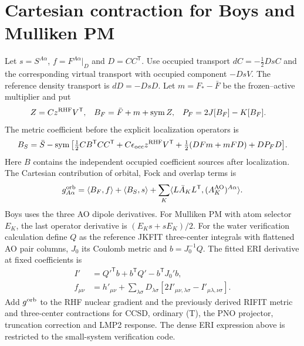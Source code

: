 \documentclass[11pt]{article}
\newcommand{\T}{^{\mathsf T}}
\newcommand{\sym}{\operatorname{sym}}
\newcommand{\ip}[2]{\langle #1,#2\rangle}
\begin{document}
\section{Cartesian contraction for Boys and Mulliken PM}
Let $s=S^{A\alpha}$, $f=F^{A\alpha}|_{D}$ and $D=CC\T$. Use occupied
transport $dC=-\tfrac12DsC$ and the corresponding virtual transport with
occupied component $-DsV$. The reference density transport is $dD=-DsD$.
Let $m=F_*-\bar F$ be the frozen--active multiplier and put
\begin{align}
 Z&=C z^{\rm RHF}V\T,& B_F&=\bar F+m+\sym Z,&
 P_F&=2J[B_F]-K[B_F].
\end{align}
The metric coefficient before the explicit localization operators is
\begin{align}
 B_S=\bar S-\sym\big[
 \tfrac12 C B\T CC\T + C\epsilon_{\rm occ}z^{\rm RHF}V\T
 +\tfrac12(DFm+mFD)+DP_F D\big].
\end{align}
Here $B$ contains the independent occupied coefficient sources after
localization. The Cartesian contribution of orbital, Fock and overlap terms is
\begin{equation}
 g_{A\alpha}^{\rm orb}=\ip{B_F}{f}+\ip{B_S}{s}
 +\sum_K\ip{L\bar A_K L\T}{(A_K^{\rm AO})^{A\alpha}}.
\end{equation}
Boys uses the three AO dipole derivatives. For Mulliken PM with atom selector
$E_K$, the last operator derivative is $(E_Ks+sE_K)/2$.
For the water verification calculation define $Q$ as the reference JKFIT
three-center integrals with flattened AO pair columns, $J_0$ its Coulomb
metric and $b=J_0^{-1}Q$. The fitted ERI derivative at fixed coefficients is
\begin{align}
 I'&={Q'}\T b+b\T Q'-b\T J_0' b,\\
 f_{\mu\nu}&=h'_{\mu\nu}+\sum_{\lambda\sigma}D_{\lambda\sigma}
 [2 I'_{\mu\nu,\lambda\sigma}-I'_{\mu\lambda,\nu\sigma}].
\end{align}
Add $g^{\rm orb}$ to the RHF nuclear gradient and the previously derived
RIFIT metric and three-center contractions for CCSD, ordinary (T), the PNO
projector, truncation correction and LMP2 response. The dense ERI expression
above is restricted to the small-system verification code.
\end{document}
